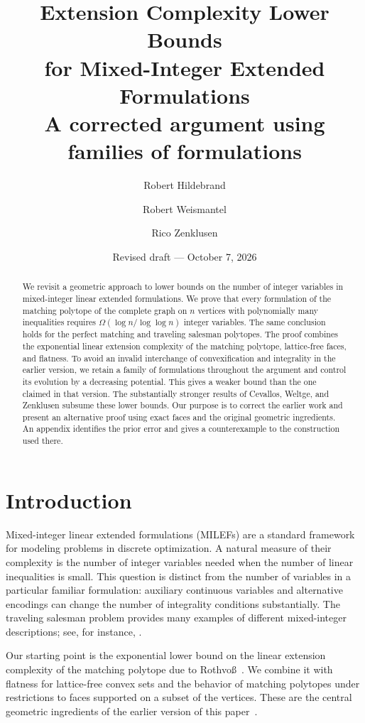 \documentclass[11pt]{article}
\title{Extension Complexity Lower Bounds\\for Mixed-Integer Extended Formulations\\[0.4em]
\large A corrected argument using families of formulations}
\author{Robert Hildebrand \and Robert Weismantel \and Rico Zenklusen}
\date{Revised draft --- October 7, 2026}
\theoremstyle{definition}
\begin{document}
\maketitle

\begin{abstract}
We revisit a geometric approach to lower bounds on the number of integer
variables in mixed-integer linear extended formulations. We prove that every
formulation of the matching polytope of the complete graph on $n$ vertices
with polynomially many inequalities requires
$\Omega(\log n/\log\log n)$ integer variables. The same conclusion holds
for the perfect matching and traveling salesman polytopes. The proof combines
the exponential linear extension complexity of the matching polytope,
lattice-free faces, and flatness. To avoid an invalid interchange of convexification
and integrality in the earlier version, we retain a family of formulations
throughout the argument and control its evolution by a decreasing potential.
This gives a weaker bound than the one claimed in that version.
The substantially stronger results of Cevallos, Weltge, and Zenklusen subsume
these lower bounds. Our purpose is to correct the earlier work and present
an alternative proof using exact faces and the original geometric ingredients.
An appendix identifies the prior error and gives a counterexample to the
construction used there.
\end{abstract}

\section{Introduction}

Mixed-integer linear extended formulations (MILEFs) are a standard framework
for modeling problems in discrete optimization. A natural measure of their
complexity is the number of integer variables needed when the number of linear
inequalities is small. This question is distinct from the number of variables
in a particular familiar formulation: auxiliary continuous variables and
alternative encodings can change the number of integrality conditions
substantially. The traveling salesman problem provides many examples of
different mixed-integer descriptions; see, for instance,
\cite{miller_1960_integer,padberg_1991_analytical,oncan_2009_comparative}.

Our starting point is the exponential lower bound on the linear extension
complexity of the matching polytope due to Rothvo\ss~\cite{rothvoss_2014_matching}.
We combine it with flatness for lattice-free convex sets and the behavior of
matching polytopes under restrictions to faces supported on a subset of the
vertices. These are the central geometric ingredients of the earlier version
of this paper~\cite{HWZ2016}.
\end{document}
